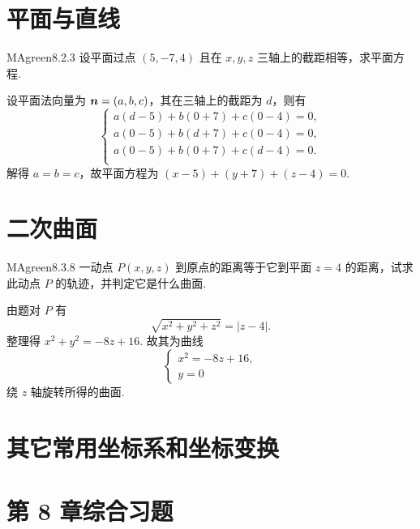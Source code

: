\section{平面与直线}

\begin{problem}{MAgreen}{8.2.3}
    设平面过点 $(5, -7, 4)$ 且在 $x, y, z$ 三轴上的截距相等，求平面方程.
\end{problem}

\begin{solution}
    设平面法向量为 $\boldsymbol n = (a, b, c)$，其在三轴上的截距为 $d$，则有
    \[
        \begin{cases}
            a(d-5) + b(0+7) + c(0-4) = 0, \\
            a(0-5) + b(d+7) + c(0-4) = 0, \\
            a(0-5) + b(0+7) + c(d-4) = 0. \\
        \end{cases}
    \]
    解得 $a = b = c$，故平面方程为 $(x-5) + (y+7) + (z-4) = 0$.
\end{solution}

\section{二次曲面}

\begin{problem}{MAgreen}{8.3.8}
    一动点 $P(x, y, z)$ 到原点的距离等于它到平面 $z = 4$ 的距离，试求此动点 $P$ 的轨迹，并判定它是什么曲面.
\end{problem}

\begin{solution}
    由题对 $P$ 有
    \[
        \sqrt{x^2 + y^2 + z^2} = |z - 4|.
    \]
    整理得 $x^2 + y^2 = -8z + 16$. 故其为曲线
    \[
        \begin{cases}
            x^2 = -8z + 16, \\
            y = 0
        \end{cases}
    \]
    绕 $z$ 轴旋转所得的曲面.
\end{solution}

\section{其它常用坐标系和坐标变换}

\section*{第 8 章综合习题}
